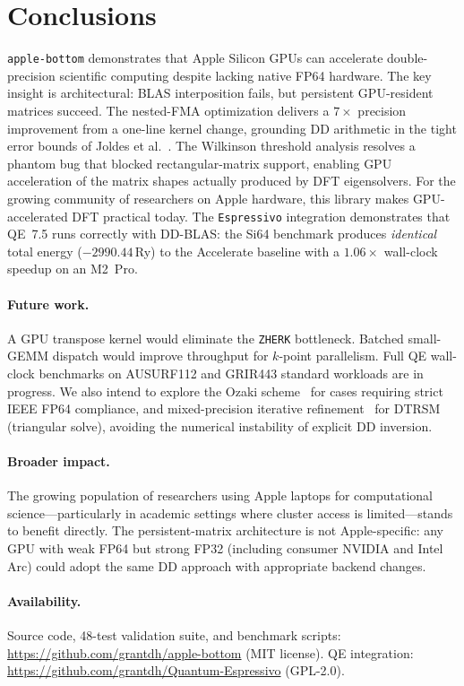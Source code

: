 \documentclass[conference]{IEEEtran}
\newcommand{\ZHERK}{\texttt{ZHERK}}
\newcommand{\AB}{\texttt{apple-bottom}}
\begin{document}
\section{Conclusions}
\label{sec:conclusions}
\AB{} demonstrates that Apple Silicon GPUs can accelerate double-precision scientific computing despite lacking native FP64 hardware. The key insight is architectural: BLAS interposition fails, but persistent GPU-resident matrices succeed. The nested-FMA optimization delivers a $7{\times}$ precision improvement from a one-line kernel change, grounding DD arithmetic in the tight error bounds of Joldes et al.~\cite{Joldes2017}. The Wilkinson threshold analysis resolves a phantom bug that blocked rectangular-matrix support, enabling GPU acceleration of the matrix shapes actually produced by DFT eigensolvers.
For the growing community of researchers on Apple hardware, this library makes GPU-accelerated DFT practical today. The \texttt{Espressivo} integration demonstrates that QE~7.5 runs correctly with DD-BLAS: the Si64 benchmark produces \emph{identical} total energy ($-2990.44$\,Ry) to the Accelerate baseline with a $1.06{\times}$ wall-clock speedup on an M2~Pro.
\paragraph{Future work.} A GPU transpose kernel would eliminate the \ZHERK{} bottleneck. Batched small-GEMM dispatch would improve throughput for $k$-point parallelism. Full QE wall-clock benchmarks on AUSURF112 and GRIR443 standard workloads are in progress. We also intend to explore the Ozaki scheme~\cite{Ozaki2012} for cases requiring strict IEEE FP64 compliance, and mixed-precision iterative refinement~\cite{Baboulin2009} for DTRSM (triangular solve), avoiding the numerical instability of explicit DD inversion.
\paragraph{Broader impact.} The growing population of researchers using Apple laptops for computational science---particularly in academic settings where cluster access is limited---stands to benefit directly. The persistent-matrix architecture is not Apple-specific: any GPU with weak FP64 but strong FP32 (including consumer NVIDIA and Intel Arc) could adopt the same DD approach with appropriate backend changes.
\paragraph{Availability.} Source code, 48-test validation suite, and benchmark scripts: \url{https://github.com/grantdh/apple-bottom} (MIT license). QE integration: \url{https://github.com/grantdh/Quantum-Espressivo} (GPL-2.0).
\end{document}

